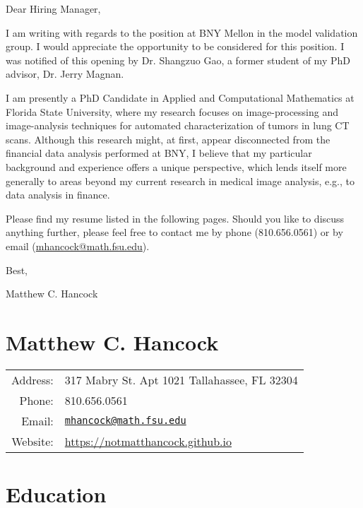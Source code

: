 \documentclass[a4paper,10pt]{report}
\begin{document}
\vspace*{2in}

\noindent Dear Hiring Manager,

\vspace{0.25in}

\begin{onehalfspace}
\noindent I am writing with regards to the position at BNY Mellon in the model validation group. I would appreciate the opportunity to be considered for this position. I was notified of this opening by Dr. Shangzuo Gao, a former student of my PhD advisor, Dr. Jerry Magnan.

I am presently a PhD Candidate in Applied and Computational Mathematics at Florida State University, where my research focuses on image-processing and image-analysis techniques for automated characterization of tumors in lung CT scans. Although this research might, at first, appear disconnected from the financial data analysis performed at BNY, I believe that my particular background and experience offers a unique perspective, which lends itself more generally to areas beyond my current research in medical image analysis, e.g., to data analysis in finance.

Please find my resume listed in the following pages. Should you like to discuss anything further, please feel free to contact me by phone (810.656.0561) or by email (\href{mailto:mhancock@math.fsu.edu}{mhancock@math.fsu.edu}).
\end{onehalfspace}

\vspace{0.25in}

\noindent Best,

\noindent Matthew C. Hancock

\clearpage

\section{Matthew C. Hancock}

\begin{tabular}{rl}
Address: & 317 Mabry St. Apt 1021 
           Tallahassee, FL 32304 \\
Phone: & 810.656.0561 \\
Email: & \href{mailto:mhancock@math.fsu.edu}{\nolinkurl{mhancock@math.fsu.edu}} \\
Website: & \url{https://notmatthancock.github.io}\end{tabular}

\section{Education}
\end{document}
